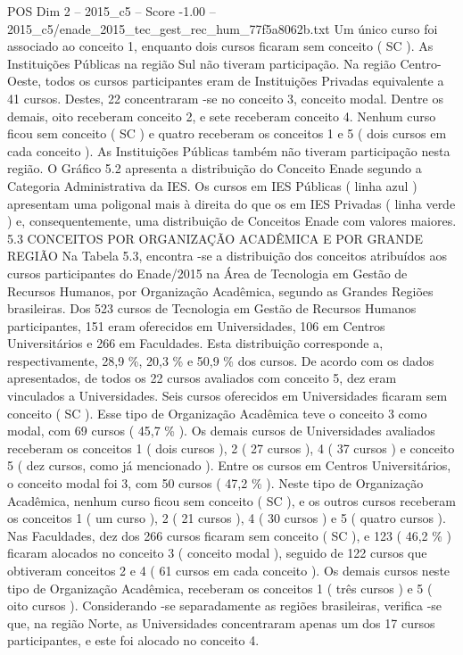 \begin{textsample}{POS Dim 2 – 2015\_c5 – Score -1.00 – 2015\_c5/enade\_2015\_tec\_gest\_rec\_hum\_77f5a8062b.txt}
Um único curso foi associado ao conceito 1, enquanto dois cursos ficaram sem conceito ( SC ).
As Instituições Públicas na região Sul não tiveram participação.
Na região Centro-Oeste, todos os cursos participantes eram de Instituições Privadas equivalente a 41 cursos.
Destes, 22 concentraram -se no conceito 3, conceito modal.
Dentre os demais, oito receberam conceito 2, e sete receberam conceito 4.
Nenhum curso ficou sem conceito ( SC ) e quatro receberam os conceitos 1 e 5 ( dois cursos em cada conceito ).
As Instituições Públicas também não tiveram participação nesta região.
O Gráfico 5.2 apresenta a distribuição do Conceito Enade segundo a Categoria Administrativa da IES.
Os cursos em IES Públicas ( linha azul ) apresentam uma poligonal mais à direita do que os em IES Privadas ( linha verde ) e, consequentemente, uma distribuição de Conceitos Enade com valores maiores. 5.3 CONCEITOS POR ORGANIZAÇÃO ACADÊMICA E POR GRANDE REGIÃO Na Tabela 5.3, encontra -se a distribuição dos conceitos atribuídos aos cursos participantes do Enade/2015 na Área de Tecnologia em Gestão de Recursos Humanos, por Organização Acadêmica, segundo as Grandes Regiões brasileiras.
Dos 523 cursos de Tecnologia em Gestão de Recursos Humanos participantes, 151 eram oferecidos em Universidades, 106 em Centros Universitários e 266 em Faculdades.
Esta distribuição corresponde a, respectivamente, 28,9 \%, 20,3 \% e 50,9 \% dos cursos.
De acordo com os dados apresentados, de todos os 22 cursos avaliados com conceito 5, dez eram vinculados a Universidades.
Seis cursos oferecidos em Universidades ficaram sem conceito ( SC ).
Esse tipo de Organização Acadêmica teve o conceito 3 como modal, com 69 cursos ( 45,7 \% ).
Os demais cursos de Universidades avaliados receberam os conceitos 1 ( dois cursos ), 2 ( 27 cursos ), 4 ( 37 cursos ) e conceito 5 ( dez cursos, como já mencionado ).
Entre os cursos em Centros Universitários, o conceito modal foi 3, com 50 cursos ( 47,2 \% ).
Neste tipo de Organização Acadêmica, nenhum curso ficou sem conceito ( SC ), e os outros cursos receberam os conceitos 1 ( um curso ), 2 ( 21 cursos ), 4 ( 30 cursos ) e 5 ( quatro cursos ).
Nas Faculdades, dez dos 266 cursos ficaram sem conceito ( SC ), e 123 ( 46,2 \% ) ficaram alocados no conceito 3 ( conceito modal ), seguido de 122 cursos que obtiveram conceitos 2 e 4 ( 61 cursos em cada conceito ).
Os demais cursos neste tipo de Organização Acadêmica, receberam os conceitos 1 ( três cursos ) e 5 ( oito cursos ).
Considerando -se separadamente as regiões brasileiras, verifica -se que, na região Norte, as Universidades concentraram apenas um dos 17 cursos participantes, e este foi alocado no conceito 4.

\end{textsample}

